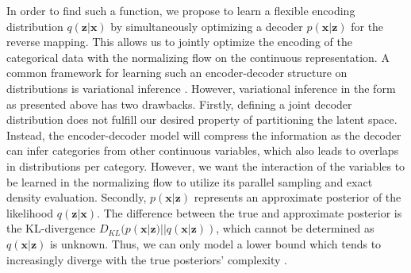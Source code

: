 In order to find such a function, we propose to learn a flexible encoding distribution $q(\bm{z}|\bm{x})$ by simultaneously optimizing a decoder $p(\bm{x}|\bm{z})$ for the reverse mapping. 
This allows us to jointly optimize the encoding of the categorical data with the normalizing flow on the continuous representation. 
A common framework for learning such an encoder-decoder structure on distributions is variational inference \cite{VAE, NormalizingFlowsFundamentals}. 
However, variational inference in the form as presented above has two drawbacks. 
Firstly, defining a joint decoder distribution does not fulfill our desired property of partitioning the latent space. 
Instead, the encoder-decoder model will compress the information as the decoder can infer categories from other continuous variables, which also leads to overlaps in distributions per category. 
However, we want the interaction of the variables to be learned in the normalizing flow to utilize its parallel sampling and exact density evaluation.
Secondly, $p(\bm{x}|\bm{z})$ represents an approximate posterior of the likelihood $q(\bm{z}|\bm{x})$. The difference between the true and approximate posterior is the KL-divergence $D_{KL}(p(\bm{x}|\bm{z})||q(\bm{x}|\bm{z}))$, which cannot be determined as $q(\bm{x}|\bm{z})$ is unknown.
Thus, we can only model a lower bound which tends to increasingly diverge with the true posteriors' complexity \cite{VAEDeeperUnderstanding, VAEAdvances}. 

